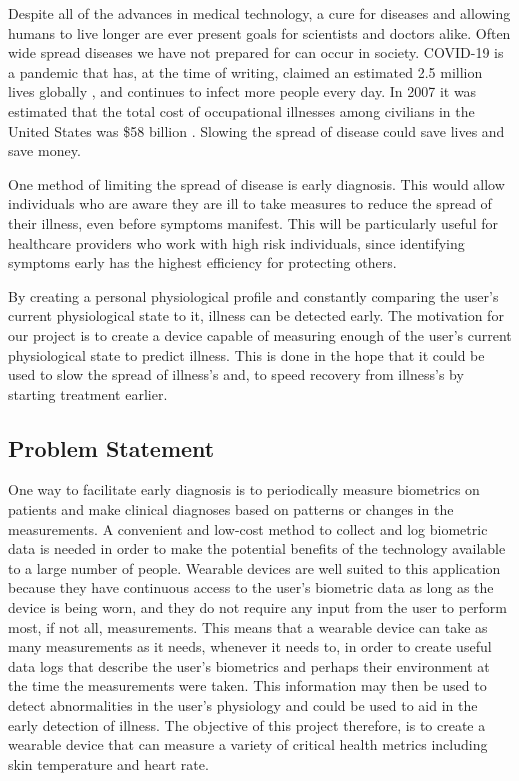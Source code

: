 Despite all of the advances in medical technology, a cure for diseases and
allowing humans to live longer are ever present goals for scientists and 
doctors alike.  Often wide spread diseases we have not prepared for can occur in
society.  COVID-19 is a pandemic that
has, at the time of writing, claimed an estimated 2.5 million lives globally
\cite{johns-hopkins-corona-chan}, and continues to infect more people every
day.  In 2007 it was estimated that the total cost of occupational illnesses
among civilians in the United States was \$58 billion \cite{Leigh2011}.
Slowing the spread of disease could save lives and save money.

One method of limiting the spread of disease is early diagnosis.  This would
allow individuals who are aware they are ill to take measures to reduce the
spread of their illness, even before symptoms manifest.  This will be
particularly useful for healthcare providers who work with high risk
individuals, since identifying symptoms early has the highest efficiency for
protecting others.

By creating a personal physiological profile and constantly
comparing the user's current physiological state to it, illness can be detected
early.  The motivation for our project is to create a device capable of measuring 
enough of the user's current physiological state to predict illness.  This is done 
in the hope that it could be used to slow the spread of illness's and, to speed
recovery from illness's by starting treatment earlier.

\subsection{Problem Statement}

One way to facilitate early diagnosis is to periodically measure biometrics on 
patients and make clinical diagnoses based on patterns or changes in the 
measurements. A convenient and low-cost method to collect and log biometric data 
is needed in order to make the potential benefits of the technology available to 
a large number of people. Wearable devices are well suited to this application 
because they have continuous access to the user’s biometric data as long as the 
device is being worn, and they do not require any input from the user to perform 
most, if not all, measurements. This means that a wearable device can take as 
many measurements as it needs, whenever it needs to, in order to create useful 
data logs that describe the user’s biometrics and perhaps their environment at 
the time the measurements were taken.  This information may then be used to 
detect abnormalities in the user’s physiology and could be used to aid in the 
early detection of illness. The objective of this project therefore, is to 
create a wearable device that can measure a variety of critical health metrics 
including skin temperature and heart rate.

